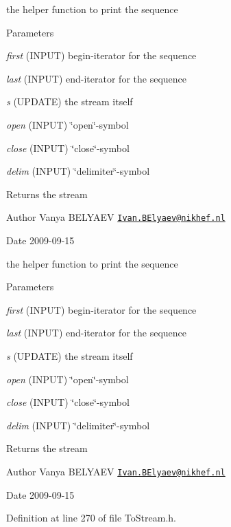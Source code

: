 the helper function to print the sequence 
\begin{DoxyParams}{Parameters}
\item[{\em first}](INPUT) begin-\/iterator for the sequence \item[{\em last}](INPUT) end-\/iterator for the sequence \item[{\em s}](UPDATE) the stream itself \item[{\em open}](INPUT) \char`\"{}open\char`\"{}-\/symbol \item[{\em close}](INPUT) \char`\"{}close\char`\"{}-\/symbol \item[{\em delim}](INPUT) \char`\"{}delimiter\char`\"{}-\/symbol \end{DoxyParams}
\begin{DoxyReturn}{Returns}
the stream 
\end{DoxyReturn}
\begin{DoxyAuthor}{Author}
Vanya BELYAEV \href{mailto:Ivan.BElyaev@nikhef.nl}{\tt Ivan.BElyaev@nikhef.nl} 
\end{DoxyAuthor}
\begin{DoxyDate}{Date}
2009-\/09-\/15
\end{DoxyDate}
the helper function to print the sequence 
\begin{DoxyParams}{Parameters}
\item[{\em first}](INPUT) begin-\/iterator for the sequence \item[{\em last}](INPUT) end-\/iterator for the sequence \item[{\em s}](UPDATE) the stream itself \item[{\em open}](INPUT) \char`\"{}open\char`\"{}-\/symbol \item[{\em close}](INPUT) \char`\"{}close\char`\"{}-\/symbol \item[{\em delim}](INPUT) \char`\"{}delimiter\char`\"{}-\/symbol \end{DoxyParams}
\begin{DoxyReturn}{Returns}
the stream 
\end{DoxyReturn}
\begin{DoxyAuthor}{Author}
Vanya BELYAEV \href{mailto:Ivan.BElyaev@nikhef.nl}{\tt Ivan.BElyaev@nikhef.nl} 
\end{DoxyAuthor}
\begin{DoxyDate}{Date}
2009-\/09-\/15 
\end{DoxyDate}


Definition at line 270 of file ToStream.h.

